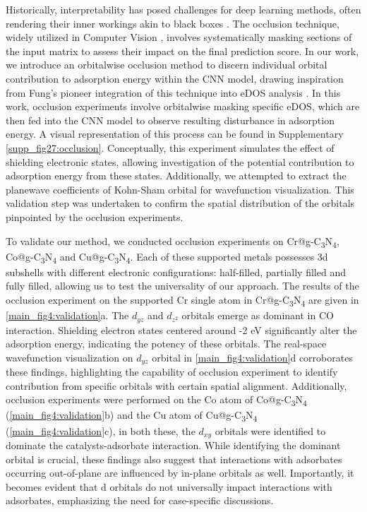     Historically, interpretability has posed challenges for deep learning methods, often rendering their inner workings akin to black boxes \cite{zhang2018interpretable, zhang2018visual, savage2022breaking}.
    The occlusion technique, widely utilized in Computer Vision \cite{zeiler2014visualizing, kortylewski2020combining, wang2020robust}, involves systematically masking sections of the input matrix to assess their impact on the final prediction score.
    In our work, we introduce an orbitalwise occlusion method to discern individual orbital contribution to adsorption energy within the CNN model, drawing inspiration from Fung's pioneer integration of this technique into eDOS analysis \cite{fung2021machine}.
    In this work, occlusion experiments involve orbitalwise masking specific eDOS, which are then fed into the CNN model to observe resulting disturbance in adsorption energy.
    A visual representation of this process can be found in Supplementary \cref{supp_fig27:occlusion}. Conceptually, this experiment simulates the effect of shielding electronic states, allowing investigation of the potential contribution to adsorption energy from these states.
    Additionally, we attempted to extract the planewave coefficients of Kohn-Sham orbital for wavefunction visualization.
    This validation step was undertaken to confirm the spatial distribution of the orbitals pinpointed by the occlusion experiments.

    To validate our method, we conducted occlusion experiments on Cr@g-C\textsubscript{3}N\textsubscript{4}, Co@g-C\textsubscript{3}N\textsubscript{4} and Cu@g-C\textsubscript{3}N\textsubscript{4}.
    Each of these supported metals possesses 3d subshells with different electronic configurations: half-filled, partially filled and fully filled, allowing us to test the universality of our approach.
    The results of the occlusion experiment on the supported Cr single atom in Cr@g-C\textsubscript{3}N\textsubscript{4} are given in \cref{main_fig4:validation}a.
    The $d_{yz}$ and $d_{z^2}$ orbitals emerge as dominant in CO interaction.
    Shielding electron states centered around -2 eV significantly alter the adsorption energy, indicating the potency of these orbitals.
    The real-space wavefunction visualization on $d_{yz}$ orbital in \cref{main_fig4:validation}d corroborates these findings, highlighting the capability of occlusion experiment to identify contribution from specific orbitals with certain spatial alignment.
    Additionally, occlusion experiments were performed on the Co atom of Co@g-C\textsubscript{3}N\textsubscript{4} (\cref{main_fig4:validation}b) and the Cu atom of Cu@g-C\textsubscript{3}N\textsubscript{4} (\cref{main_fig4:validation}c), in both these, the $d_{xy}$ orbitals were identified to dominate the catalysts-adsorbate interaction.
    While identifying the dominant orbital is crucial, these findings also suggest that interactions with adsorbates occurring out-of-plane are influenced by in-plane orbitals as well.
    Importantly, it becomes evident that d orbitals do not universally impact interactions with adsorbates, emphasizing the need for case-specific discussions.

